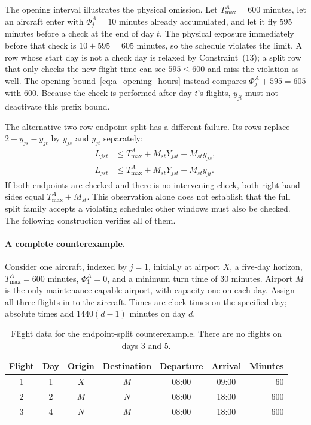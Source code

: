 The opening interval illustrates the physical omission. Let
$T^A_{\max}=600$ minutes, let an aircraft enter with
$\Phi^A_j=10$ minutes already accumulated, and let it fly 595 minutes before
a check at the end of day $t$. The physical exposure immediately before that
check is $10+595=605$ minutes, so the schedule violates the limit. A row
whose start day is not a check day is relaxed by Constraint~(13); a split row
that only checks the new flight time can see $595\le600$ and miss the
violation as well. The opening bound~\eqref{eq:a_opening_hours} instead
compares $\Phi^A_j+595=605$ with 600. Because the check is performed after
day $t$'s flights, $y_{jt}$ must not deactivate this prefix bound.

The alternative two-row endpoint split has a different failure. Its rows
replace $2-y_{js}-y_{jt}$ by $y_{js}$ and $y_{jt}$ separately:
\begin{align}
  L_{jst}&\le T^A_{\max}+M_{st}Y_{jst}+M_{st}y_{js},
    \label{eq:a_split_start}\\
  L_{jst}&\le T^A_{\max}+M_{st}Y_{jst}+M_{st}y_{jt}.
    \label{eq:a_split_end}
\end{align}
If both endpoints are checked and there is no intervening check, both
right-hand sides equal $T^A_{\max}+M_{st}$. This observation alone does not
establish that the full split family accepts a violating schedule: other
windows must also be checked. The following construction verifies all of them.

\paragraph{A complete counterexample.}
Consider one aircraft, indexed by $j=1$, initially at airport $X$, a
five-day horizon, $T^A_{\max}=600$ minutes, $\Phi^A_1=0$, and a minimum
turn time of 30 minutes. Airport $M$ is the only maintenance-capable airport,
with capacity one on each day. Assign all three flights in
 to the aircraft. Times are clock times on the
specified day; absolute times add $1440(d-1)$ minutes on day $d$.

\begin{table}[t]
\centering\small
\caption{Flight data for the endpoint-split counterexample. There are no
  flights on days 3 and 5.}
\label{tab:a_split_witness}
\begin{tabular}{ccccccr}
\toprule
Flight & Day & Origin & Destination & Departure & Arrival & Minutes \\
\midrule
1 & 1 & $X$ & $M$ & 08:00 & 09:00 & 60 \\
2 & 2 & $M$ & $N$ & 08:00 & 18:00 & 600 \\
3 & 4 & $N$ & $M$ & 08:00 & 18:00 & 600 \\
\bottomrule
\end{tabular}
\end{table}

